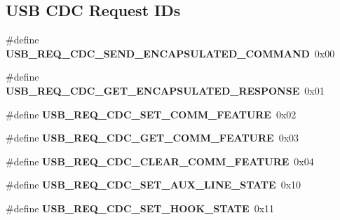 \subsection*{U\-S\-B C\-D\-C Request I\-Ds}
\begin{DoxyCompactItemize}
\item 
\hypertarget{group__cdc__protocol__group_gac9488d02fd62ae9c3cbaea21a92ab06c}{\#define {\bfseries U\-S\-B\-\_\-\-R\-E\-Q\-\_\-\-C\-D\-C\-\_\-\-S\-E\-N\-D\-\_\-\-E\-N\-C\-A\-P\-S\-U\-L\-A\-T\-E\-D\-\_\-\-C\-O\-M\-M\-A\-N\-D}~0x00}\label{group__cdc__protocol__group_gac9488d02fd62ae9c3cbaea21a92ab06c}

\item 
\hypertarget{group__cdc__protocol__group_gaea0db4450686edfe7f5ecbd7772db08c}{\#define {\bfseries U\-S\-B\-\_\-\-R\-E\-Q\-\_\-\-C\-D\-C\-\_\-\-G\-E\-T\-\_\-\-E\-N\-C\-A\-P\-S\-U\-L\-A\-T\-E\-D\-\_\-\-R\-E\-S\-P\-O\-N\-S\-E}~0x01}\label{group__cdc__protocol__group_gaea0db4450686edfe7f5ecbd7772db08c}

\item 
\hypertarget{group__cdc__protocol__group_ga84c2ea5b5542b229be667ba6ad81d97f}{\#define {\bfseries U\-S\-B\-\_\-\-R\-E\-Q\-\_\-\-C\-D\-C\-\_\-\-S\-E\-T\-\_\-\-C\-O\-M\-M\-\_\-\-F\-E\-A\-T\-U\-R\-E}~0x02}\label{group__cdc__protocol__group_ga84c2ea5b5542b229be667ba6ad81d97f}

\item 
\hypertarget{group__cdc__protocol__group_gaf04ea09f95ab7fb012462f7679c126d4}{\#define {\bfseries U\-S\-B\-\_\-\-R\-E\-Q\-\_\-\-C\-D\-C\-\_\-\-G\-E\-T\-\_\-\-C\-O\-M\-M\-\_\-\-F\-E\-A\-T\-U\-R\-E}~0x03}\label{group__cdc__protocol__group_gaf04ea09f95ab7fb012462f7679c126d4}

\item 
\hypertarget{group__cdc__protocol__group_ga85bffa3729c58e2ac4cbec0c3bc0873c}{\#define {\bfseries U\-S\-B\-\_\-\-R\-E\-Q\-\_\-\-C\-D\-C\-\_\-\-C\-L\-E\-A\-R\-\_\-\-C\-O\-M\-M\-\_\-\-F\-E\-A\-T\-U\-R\-E}~0x04}\label{group__cdc__protocol__group_ga85bffa3729c58e2ac4cbec0c3bc0873c}

\item 
\hypertarget{group__cdc__protocol__group_ga283df094c43680698900ac8fdefb7687}{\#define {\bfseries U\-S\-B\-\_\-\-R\-E\-Q\-\_\-\-C\-D\-C\-\_\-\-S\-E\-T\-\_\-\-A\-U\-X\-\_\-\-L\-I\-N\-E\-\_\-\-S\-T\-A\-T\-E}~0x10}\label{group__cdc__protocol__group_ga283df094c43680698900ac8fdefb7687}

\item 
\hypertarget{group__cdc__protocol__group_ga193e50f401d74557e36be10f8be0ddbd}{\#define {\bfseries U\-S\-B\-\_\-\-R\-E\-Q\-\_\-\-C\-D\-C\-\_\-\-S\-E\-T\-\_\-\-H\-O\-O\-K\-\_\-\-S\-T\-A\-T\-E}~0x11}\label{group__cdc__protocol__group_ga193e50f401d74557e36be10f8be0ddbd}


\end{DoxyCompactItemize}
